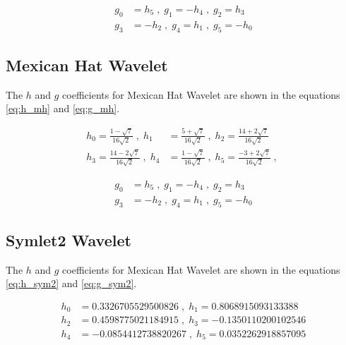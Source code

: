\documentclass[12pt]{article}
\begin{document}
	\begin{equation}
		\begin{aligned}
		g_0 &= h_5 \;,\; g_1 = -h_4 \;,\; g_2 = h_3 \\
		g_3 &= -h_2 \;,\; g_4 = h_1 \;,\; g_5 = -h_0
		\end{aligned}
		\label{eq:g_db6}
	\end{equation}
	
	\subsection{Mexican Hat Wavelet}
	The  $h$ and $g$ coefficients for Mexican Hat Wavelet are shown in the equations \ref{eq:h_mh} and \ref{eq:g_mh}.
	
	\begin{equation}
		\begin{aligned}
			h_0 = \frac{1-\sqrt7}{16\sqrt2} \;,\; h_1 &= \frac{5+\sqrt7}{16\sqrt2} \;,\; h_2 = \frac{14+2\sqrt7}{16\sqrt2} \\
			h_3 = \frac{14-2\sqrt7}{16\sqrt2} \;,\; h_4 &= \frac{1-\sqrt7}{16\sqrt2} \;,\; h_5 = \frac{-3+2\sqrt7}{16\sqrt2} \;,\;
		\end{aligned}
		\label{eq:h_mh}
	\end{equation}
	
	\begin{equation}
		\begin{aligned}
			g_0 &= h_5 \;,\; g_1 = -h_4 \;,\; g_2 = h_3 \\
			g_3 &= -h_2 \;,\; g_4 = h_1 \;,\; g_5 = -h_0
		\end{aligned}
		\label{eq:g_mh}
	\end{equation}
	
	\subsection{Symlet2 Wavelet}
	
	The  $h$ and $g$ coefficients for Mexican Hat Wavelet are shown in the equations \ref{eq:h_sym2} and \ref{eq:g_sym2}.
	
	\begin{equation}
		\begin{aligned}
			h_0 &= 0.3326705529500826 \;,\; h_1 = 0.8068915093133388 \\
			h_2 &= 0.4598775021184915 \;,\; h_3 = -0.1350110200102546 \\
			h_4 &= -0.0854412738820267 \;,\; h_5 = 0.0352262918857095
		\end{aligned}
		\label{eq:h_sym2}
	\end{equation}
	
\end{document}
